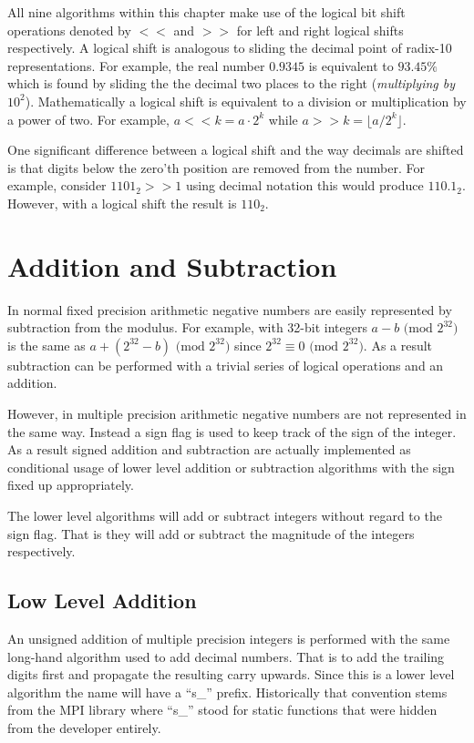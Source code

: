 \documentclass[b5paper]{book}
\begin{document}
All nine algorithms within this chapter make use of the logical bit shift operations denoted by $<<$ and $>>$ for left and right 
logical shifts respectively.  A logical shift is analogous to sliding the decimal point of radix-10 representations.  For example, the real 
number $0.9345$ is equivalent to $93.45\%$ which is found by sliding the the decimal two places to the right (\textit{multiplying by $10^2$}).  
Mathematically a logical shift is equivalent to a division or multiplication by a power of two.  
For example, $a << k = a \cdot 2^k$ while $a >> k = \lfloor a/2^k \rfloor$.

One significant difference between a logical shift and the way decimals are shifted is that digits below the zero'th position are removed
from the number.  For example, consider $1101_2 >> 1$ using decimal notation this would produce $110.1_2$.  However, with a logical shift the 
result is $110_2$.  

\section{Addition and Subtraction}
In normal fixed precision arithmetic negative numbers are easily represented by subtraction from the modulus.  For example, with 32-bit integers
$a - b\mbox{ (mod }2^{32}\mbox{)}$ is the same as $a + (2^{32} - b) \mbox{ (mod }2^{32}\mbox{)}$  since $2^{32} \equiv 0 \mbox{ (mod }2^{32}\mbox{)}$.  
As a result subtraction can be performed with a trivial series of logical operations and an addition.

However, in multiple precision arithmetic negative numbers are not represented in the same way.  Instead a sign flag is used to keep track of the
sign of the integer.  As a result signed addition and subtraction are actually implemented as conditional usage of lower level addition or 
subtraction algorithms with the sign fixed up appropriately.

The lower level algorithms will add or subtract integers without regard to the sign flag.  That is they will add or subtract the magnitude of
the integers respectively.

\subsection{Low Level Addition}
An unsigned addition of multiple precision integers is performed with the same long-hand algorithm used to add decimal numbers.  That is to add the 
trailing digits first and propagate the resulting carry upwards.  Since this is a lower level algorithm the name will have a ``s\_'' prefix.  
Historically that convention stems from the MPI library where ``s\_'' stood for static functions that were hidden from the developer entirely.
\end{document}
